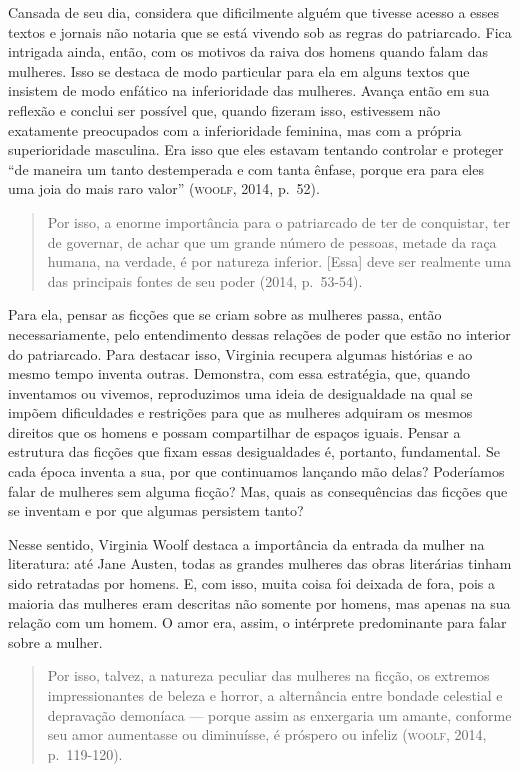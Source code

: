 Cansada de seu dia, considera que dificilmente alguém que tivesse acesso
a esses textos e jornais não notaria que se está vivendo sob as regras
do patriarcado. Fica intrigada ainda, então, com os motivos da raiva dos
homens quando falam das mulheres. Isso se destaca de modo particular
para ela em alguns textos que insistem de modo enfático na inferioridade
das mulheres. Avança então em sua reflexão e conclui ser possível que,
quando fizeram isso, estivessem não exatamente preocupados com a
inferioridade feminina, mas com a própria superioridade masculina. Era
isso que eles estavam tentando controlar e proteger ``de maneira um
tanto destemperada e com tanta ênfase, porque era para eles uma joia do
mais raro valor'' (\textsc{woolf}, 2014, p.~52).

\begin{quote}
Por isso, a enorme importância para o patriarcado de ter de
conquistar, ter de governar, de achar que um grande número de pessoas,
metade da raça humana, na verdade, é por natureza inferior. {[}Essa{]}
deve ser realmente uma das principais fontes de seu poder (2014, p.~53-54).
\end{quote}

Para ela, pensar as ficções que se criam sobre as mulheres passa, então
necessariamente, pelo entendimento dessas relações de poder que estão no
interior do patriarcado. Para destacar isso, Virginia recupera algumas
histórias e ao mesmo tempo inventa outras. Demonstra, com essa
estratégia, que, quando inventamos ou vivemos, reproduzimos uma ideia de
desigualdade na qual se impõem dificuldades e restrições para que as
mulheres adquiram os mesmos direitos que os homens e possam compartilhar
de espaços iguais. Pensar a estrutura das ficções que fixam essas
desigualdades é, portanto, fundamental. Se cada época inventa a sua, por
que continuamos lançando mão delas? Poderíamos falar de mulheres sem
alguma ficção? Mas, quais as consequências das ficções que se inventam e
por que algumas persistem tanto?

Nesse sentido, Virginia Woolf destaca a importância da entrada da mulher
na literatura: até Jane Austen, todas as grandes mulheres das obras
literárias tinham sido retratadas por homens. E, com isso, muita coisa
foi deixada de fora, pois a maioria das mulheres eram descritas não
somente por homens, mas apenas na sua relação com um homem. O amor era,
assim, o intérprete predominante para falar sobre a mulher.

\begin{quote}
Por isso, talvez, a natureza peculiar das mulheres na ficção, os
extremos impressionantes de beleza e horror, a alternância entre bondade
celestial e depravação demoníaca --- porque assim as enxergaria um
amante, conforme seu amor aumentasse ou diminuísse, é próspero ou
infeliz (\textsc{woolf}, 2014, p.~119-120).
\end{quote}

